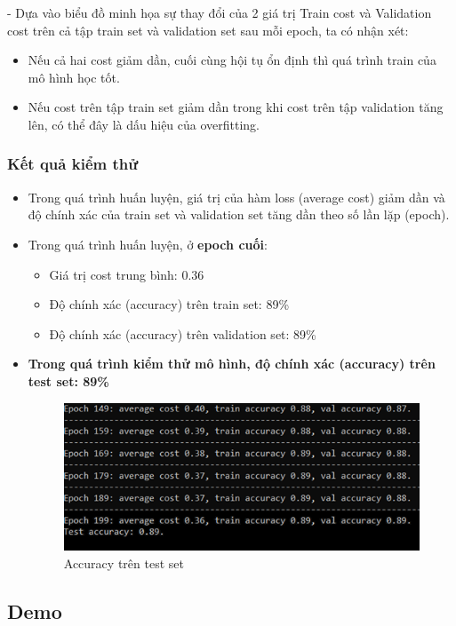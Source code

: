 - Dựa vào biểu đồ minh họa sự thay đổi của 2 giá trị Train cost và Validation cost trên cả tập train set và validation set sau mỗi epoch, ta có nhận xét: 
\begin{itemize}
    \item Nếu cả hai cost giảm dần, cuối cùng hội tụ ổn định thì quá trình train của mô hình học tốt. 
    \item Nếu cost trên tập train set giảm dần trong khi cost trên tập validation tăng lên, có thể đây là dấu hiệu của overfitting. 
\end{itemize}

\subsubsection{Kết quả kiểm thử} 
\begin{itemize}
    \item Trong quá trình huấn luyện, giá trị của hàm loss (average cost) giảm dần và độ chính xác của train set và validation set tăng dần theo số lần lặp (epoch).
    \item Trong quá trình huấn luyện, ở \textbf{epoch cuối}:
    \begin{itemize}
        \item Giá trị cost trung bình: 0.36
        \item Độ chính xác (accuracy) trên train set: 89\%
        \item Độ chính xác (accuracy) trên validation set: 89\%
    \end{itemize}
    \item \textbf{Trong quá trình kiểm thử mô hình, độ chính xác (accuracy) trên test set: 89\%}
    \begin{figure}[H]
        \centering
        \includegraphics[width=0.75\linewidth]{img/testacc.png}
        \caption{Accuracy trên test set}
        
    \end{figure}
\end{itemize}

\subsection{Demo}

